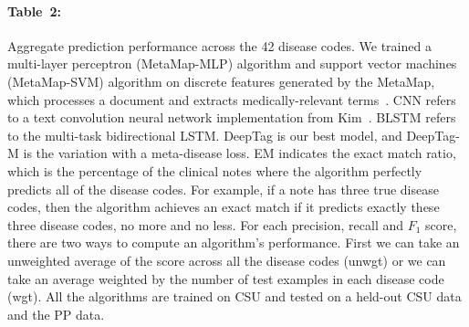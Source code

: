 \documentclass{article}[11pt,oneside]
\begin{document}
\paragraph{Table~2:} Aggregate prediction performance across the 42 disease codes. 
We trained a multi-layer perceptron (MetaMap-MLP) algorithm and support vector machines (MetaMap-SVM) algorithm on discrete features generated by the MetaMap, which processes a document and extracts medically-relevant terms~\cite{aronson2010overview}.
CNN refers to a text convolution neural network implementation from Kim~\cite{kim2014convolutional}. BLSTM refers to the multi-task bidirectional LSTM. DeepTag is our best model, and DeepTag-M is the variation with a meta-disease loss. EM indicates the exact match ratio, which is the percentage of the clinical notes where the algorithm perfectly predicts all of the disease codes. For example, if a note has three true disease codes, then the algorithm achieves an exact match if it predicts exactly these three disease codes, no more and no less. For each precision, recall and $F_1$ score, there are two ways to compute an algorithm's performance. First we can take an unweighted average of the score across all the disease codes (unwgt) or we can take an average weighted by the number of test examples in each disease code (wgt). All the algorithms are trained on CSU and tested on a held-out CSU data and the PP data. 





\end{document}
